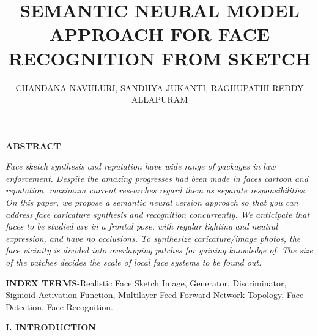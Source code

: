 \documentclass[journal]{IEEEtran} %
\title{\textbf{SEMANTIC NEURAL MODEL APPROACH FOR FACE RECOGNITION FROM SKETCH}}
\author{CHANDANA NAVULURI, SANDHYA JUKANTI, RAGHUPATHI REDDY ALLAPURAM}
\begin{document}
\maketitle


 

\textbf{ABSTRACT}:

\textit{Face sketch synthesis and reputation have wide range of packages in law enforcement. Despite the amazing progresses had been made in faces cartoon and reputation, maximum current researches regard them as  separate responsibilities. On this paper, we propose a semantic neural version approach so that you can address face caricature synthesis and recognition concurrently. We anticipate that faces to be studied are in a frontal pose, with regular lighting and neutral expression, and have no occlusions. To synthesize caricature/image photos, the face vicinity is divided into overlapping patches for gaining knowledge of. The size of the patches decides the scale of local face systems to be found out.}

\textbf{INDEX TERMS}-Realistic Face Sketch Image, Generator, Discriminator, Sigmoid Activation Function, Multilayer Feed Forward Network Topology, Face Detection, Face Recognition.

\vspace\textbf{\textbf{I. INTRODUCTION}}
\end{document}
